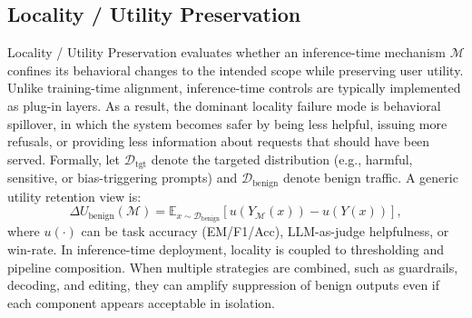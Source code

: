 \subsection{Locality / Utility Preservation}
Locality / Utility Preservation evaluates whether an inference-time mechanism $\mathcal{M}$ confines its behavioral changes to the intended scope while preserving user utility. Unlike training-time alignment, inference-time controls are typically implemented as plug-in layers. As a result, the dominant locality failure mode is behavioral spillover, in which the system becomes safer by being less helpful, issuing more refusals, or providing less information about requests that should have been served. Formally, let $\mathcal{D}_{\text{tgt}}$ denote the targeted distribution (e.g., harmful, sensitive, or bias-triggering prompts) and $\mathcal{D}_{\text{benign}}$ denote benign traffic. A generic utility retention view is:
\[
\Delta U_{\text{benign}}(\mathcal{M})
=
\mathbb{E}_{x\sim \mathcal{D}_{\text{benign}}}\!\left[u\!\left(Y_{\mathcal{M}}(x)\right) - u\!\left(Y(x)\right)\right],
\]
where $u(\cdot)$ can be task accuracy (EM/F1/Acc), LLM-as-judge helpfulness, or win-rate. In inference-time deployment, locality is coupled to thresholding and pipeline composition. When multiple strategies are combined, such as guardrails, decoding, and editing, they can amplify suppression of benign outputs even if each component appears acceptable in isolation.


